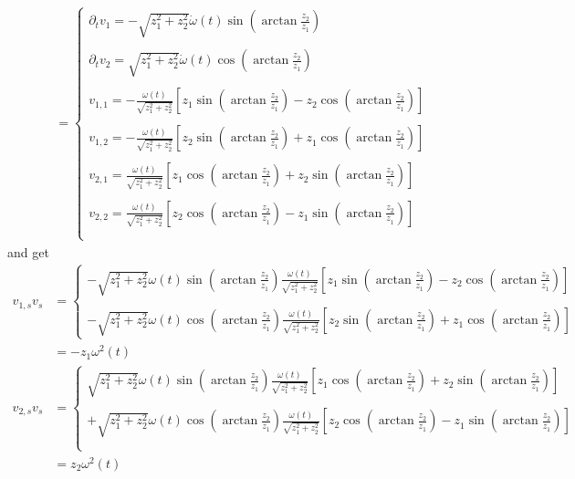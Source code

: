 \begin{align}
&=\left\{\begin{array}{l}
\partial_t v_1 = -\sqrt{z^{2}_1+z^{2}_2}\dot{\omega}(t)\sin\left(\arctan\frac{z^{}_2}{z^{}_1}\right)\\\\
\partial_t v_2 = \sqrt{z^{2}_1+z^{2}_2}\dot{\omega}(t)\cos\left(\arctan\frac{z^{}_2}{z^{}_1}\right)\\\\
v_{1,1}= -\frac{\omega(t)}{\sqrt{z^{2}_1+z^{2}_2}}\left[z_1\sin\left(\arctan\frac{z^{}_2}{z^{}_1}\right) -z_2\cos\left(\arctan\frac{z^{}_2}{z^{}_1}\right)\right]\\\\
v_{1,2}=  -\frac{\omega(t)}{\sqrt{z^{2}_1+z^{2}_2}}\left[z_2\sin\left(\arctan\frac{z^{}_2}{z^{}_1}\right) +z^{}_1\cos\left(\arctan\frac{z^{}_2}{z^{}_1}\right)\right]\\\\
v_{2,1}=  \frac{\omega(t)}{\sqrt{z^{2}_1+z^{2}_2}}\left[z_1\cos\left(\arctan\frac{z^{}_2}{z^{}_1}\right) +z_2\sin\left(\arctan\frac{z^{}_2}{z^{}_1}\right)\right]\\\\
v_{2,2}=  \frac{\omega(t)}{\sqrt{z^{2}_1+z^{2}_2}}\left[z_2\cos\left(\arctan\frac{z^{}_2}{z^{}_1}\right) -z^{}_1\sin\left(\arctan\frac{z^{}_2}{z^{}_1}\right)\right]\\\\
\end{array}\right.
\end{align}
and get
\begin{align}
v_{1,s}v_s &= \left\{\begin{array}{l}
-\sqrt{z^{2}_1+z^{2}_2}\omega(t)\sin\left(\arctan\frac{z^{}_2}{z^{}_1}\right)\frac{\omega(t)}{\sqrt{z^{2}_1+z^{2}_2}}\left[z_1\sin\left(\arctan\frac{z^{}_2}{z^{}_1}\right) -z_2\cos\left(\arctan\frac{z^{}_2}{z^{}_1}\right)\right]\\\\
-\sqrt{z^{2}_1+z^{2}_2}\omega(t)\cos\left(\arctan\frac{z^{}_2}{z^{}_1}\right)\frac{\omega(t)}{\sqrt{z^{2}_1+z^{2}_2}}\left[z_2\sin\left(\arctan\frac{z^{}_2}{z^{}_1}\right) +z^{}_1\cos\left(\arctan\frac{z^{}_2}{z^{}_1}\right)\right]
\end{array}\right.\\
&=-z_1\omega^2(t)
\end{align}
\begin{align}
v_{2,s}v_s &= \left\{\begin{array}{l}
\sqrt{z^{2}_1+z^{2}_2}\omega(t)\sin\left(\arctan\frac{z^{}_2}{z^{}_1}\right)\frac{\omega(t)}{\sqrt{z^{2}_1+z^{2}_2}}\left[z_1\cos\left(\arctan\frac{z^{}_2}{z^{}_1}\right) +z_2\sin\left(\arctan\frac{z^{}_2}{z^{}_1}\right)\right]\\\\
+\sqrt{z^{2}_1+z^{2}_2}\omega(t)\cos\left(\arctan\frac{z^{}_2}{z^{}_1}\right)\frac{\omega(t)}{\sqrt{z^{2}_1+z^{2}_2}}\left[z_2\cos\left(\arctan\frac{z^{}_2}{z^{}_1}\right) -z^{}_1\sin\left(\arctan\frac{z^{}_2}{z^{}_1}\right)\right]\\\\
\end{array}\right.\\
&= z_2\omega^2(t)
\end{align}
